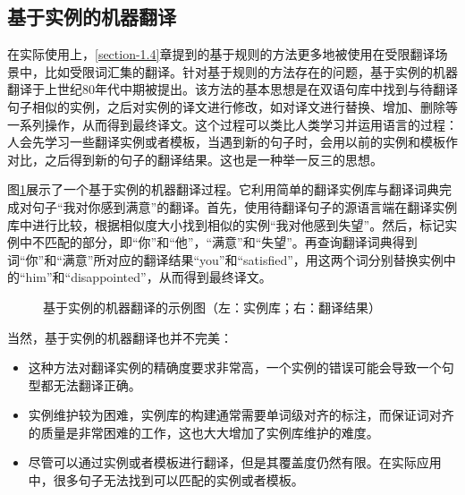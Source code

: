 \subsection{基于实例的机器翻译}

\parinterval 在实际使用上，\ref{section-1.4}章提到的基于规则的方法更多地被使用在受限翻译场景中，比如受限词汇集的翻译。针对基于规则的方法存在的问题，基于实例的机器翻译于上世纪80年代中期被提出。该方法的基本思想是在双语句库中找到与待翻译句子相似的实例，之后对实例的译文进行修改，如对译文进行替换、增加、删除等一系列操作，从而得到最终译文。这个过程可以类比人类学习并运用语言的过程：人会先学习一些翻译实例或者模板，当遇到新的句子时，会用以前的实例和模板作对比，之后得到新的句子的翻译结果。这也是一种举一反三的思想。

\parinterval 图\ref{fig:1-13}展示了一个基于实例的机器翻译过程。它利用简单的翻译实例库与翻译词典完成对句子“我对你感到满意”的翻译。首先，使用待翻译句子的源语言端在翻译实例库中进行比较，根据相似度大小找到相似的实例“我对他感到失望”。然后，标记实例中不匹配的部分，即“你”和“他”，“满意”和“失望”。再查询翻译词典得到词“你”和“满意”所对应的翻译结果“you”和“satisfied”，用这两个词分别替换实例中的“him”和“disappointed”，从而得到最终译文。

\begin{figure}[htp]
    \centering

    \caption{基于实例的机器翻译的示例图（左：实例库；右：翻译结果）}
    \label{fig:1-13}
\end{figure}

\parinterval 当然，基于实例的机器翻译也并不完美：

\begin{itemize}
\vspace{0.5em}
\item 这种方法对翻译实例的精确度要求非常高，一个实例的错误可能会导致一个句型都无法翻译正确。
\vspace{0.5em}
\item 实例维护较为困难，实例库的构建通常需要单词级对齐的标注，而保证词对齐的质量是非常困难的工作，这也大大增加了实例库维护的难度。
\vspace{0.5em}
\item 尽管可以通过实例或者模板进行翻译，但是其覆盖度仍然有限。在实际应用中，很多句子无法找到可以匹配的实例或者模板。
\vspace{0.5em}
\end{itemize}

